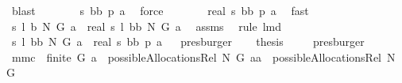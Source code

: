\begin{isabellebody}
\ blast\isanewline
\ \ \isamarkupfalse%
\ \isamarkupfalse%
\ {\isachardoublequoteopen}{\isachardot}{\isachardot}{\isachardot}\ {\isacharequal}\ {\isacharquery}s\ {\isacharquery}bb\ {\isacharparenleft}{\isacharquery}p\ a{\isacharparenright}{\isachardoublequoteclose}\ \isamarkupfalse%
\ force\isanewline
\ \ \isamarkupfalse%
\ \isamarkupfalse%
\ {\isachardoublequoteopen}{\isachardot}{\isachardot}{\isachardot}\ {\isacharequal}\ real\ {\isacharparenleft}{\isacharquery}s\ {\isacharquery}bb\ {\isacharparenleft}{\isacharquery}p\ a{\isacharparenright}{\isacharparenright}{\isachardoublequoteclose}\ \isamarkupfalse%
\ fast\isanewline
\ \ \isamarkupfalse%
\ \isamarkupfalse%
\ {\isachardoublequoteopen}{\isacharquery}s\ {\isacharparenleft}{\isacharquery}l\ {\isacharquery}b\ N\ G{\isacharparenright}\ a\ {\isacharequal}\ real\ {\isacharparenleft}{\isacharquery}s\ {\isacharparenleft}{\isacharquery}l\ {\isacharquery}bb\ N\ G{\isacharparenright}\ a{\isacharparenright}{\isachardoublequoteclose}\ \isamarkupfalse%
\ assms{\isacharparenleft}{}{\isacharparenright}\ \isamarkupfalse%
\ {\isacharparenleft}rule\ lm{}{}{}d{\isacharparenright}\isanewline
\ \ \isamarkupfalse%
\ \isamarkupfalse%
\ {\isachardoublequoteopen}{\isacharquery}s\ {\isacharparenleft}{\isacharquery}l\ {\isacharquery}bb\ N\ G{\isacharparenright}\ a\ {\isacharequal}\ real\ {\isacharparenleft}{\isacharquery}s\ {\isacharquery}bb\ {\isacharparenleft}{\isacharquery}p\ a{\isacharparenright}{\isacharparenright}{\isachardoublequoteclose}%
\endisatagproof
{\isafoldproof}%
%
\isadelimproof
%
\endisadelimproof
\ \isamarkupfalse%
\isanewline
%
\isadelimproof
%
\endisadelimproof
%
\isatagproof
{}\isamarkupfalse%
\ presburger\isanewline
\ \ \isamarkupfalse%
\ {\isacharquery}thesis\ \isamarkupfalse%
\ {}\ \isamarkupfalse%
\ presburger\isanewline
{}\isamarkupfalse%
%
\endisatagproof
{\isafoldproof}%
%
\isadelimproof
\isanewline
%
\endisadelimproof
\isanewline
{}\isamarkupfalse%
\ mm{}{}c{\isacharcolon}\ \ {\isachardoublequoteopen}finite\ G{\isachardoublequoteclose}\ {\isachardoublequoteopen}a\ {\isasymin}\ possibleAllocationsRel\ N\ G{\isachardoublequoteclose}\ {\isachardoublequoteopen}aa\ {\isasymin}\ possibleAllocationsRel\ N\ G{\isachardoublequoteclose}\isanewline

\end{isabellebody}
